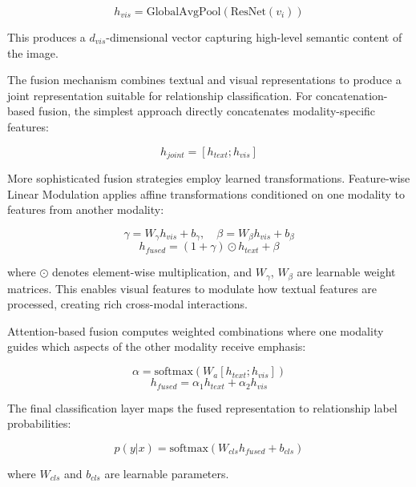 \documentclass[12pt,a4paper]{report}
\begin{document}
\begin{equation}
h_{vis} = \text{GlobalAvgPool}(\text{ResNet}(v_i))
\end{equation}

This produces a $d_{vis}$-dimensional vector capturing high-level semantic content of the image.

The fusion mechanism combines textual and visual representations to produce a joint representation suitable for relationship classification. For concatenation-based fusion, the simplest approach directly concatenates modality-specific features:

\begin{equation}
h_{joint} = [h_{text}; h_{vis}]
\end{equation}

More sophisticated fusion strategies employ learned transformations. Feature-wise Linear Modulation applies affine transformations conditioned on one modality to features from another modality:

\begin{equation}
\gamma = W_{\gamma}h_{vis} + b_{\gamma}, \quad \beta = W_{\beta}h_{vis} + b_{\beta}
\end{equation}
\begin{equation}
h_{fused} = (1 + \gamma) \odot h_{text} + \beta
\end{equation}

where $\odot$ denotes element-wise multiplication, and $W_{\gamma}$, $W_{\beta}$ are learnable weight matrices. This enables visual features to modulate how textual features are processed, creating rich cross-modal interactions.

Attention-based fusion computes weighted combinations where one modality guides which aspects of the other modality receive emphasis:

\begin{equation}
\alpha = \text{softmax}(W_a[h_{text}; h_{vis}])
\end{equation}
\begin{equation}
h_{fused} = \alpha_1 h_{text} + \alpha_2 h_{vis}
\end{equation}

The final classification layer maps the fused representation to relationship label probabilities:

\begin{equation}
p(y|x) = \text{softmax}(W_{cls}h_{fused} + b_{cls})
\end{equation}

where $W_{cls}$ and $b_{cls}$ are learnable parameters.
\end{document}
